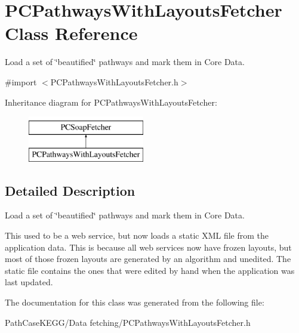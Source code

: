 \hypertarget{interface_p_c_pathways_with_layouts_fetcher}{
\section{PCPathwaysWithLayoutsFetcher Class Reference}
\label{interface_p_c_pathways_with_layouts_fetcher}
}


Load a set of \char`\"{}beautified\char`\"{} pathways and mark them in Core Data.  




{\ttfamily \#import $<$PCPathwaysWithLayoutsFetcher.h$>$}

Inheritance diagram for PCPathwaysWithLayoutsFetcher:\begin{figure}[h!]
\begin{center}
\leavevmode
\includegraphics[height=2.000000cm]{kegg_doc/interface_p_c_pathways_with_layouts_fetcher}
\end{center}
\end{figure}


\subsection{Detailed Description}
Load a set of \char`\"{}beautified\char`\"{} pathways and mark them in Core Data. 

This used to be a web service, but now loads a static XML file from the application data. This is because all web services now have frozen layouts, but most of those frozen layouts are generated by an algorithm and unedited. The static file contains the ones that were edited by hand when the application was last updated. 

The documentation for this class was generated from the following file:\begin{DoxyCompactItemize}
\item 
PathCaseKEGG/Data fetching/PCPathwaysWithLayoutsFetcher.h\end{DoxyCompactItemize}
